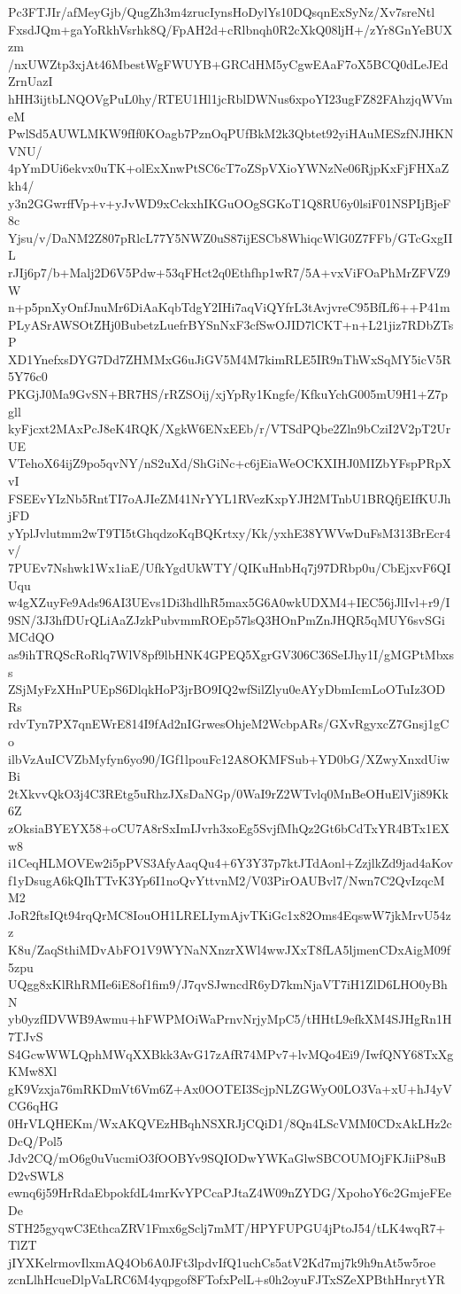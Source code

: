 Pc3FTJIr/afMeyGjb/QugZh3m4zrucIynsHoDylYs10DQsqnExSyNz/Xv7sreNtl
FxsdJQm+gaYoRkhVsrhk8Q/FpAH2d+cRlbnqh0R2cXkQ08ljH+/zYr8GnYeBUXzm
/nxUWZtp3xjAt46MbestWgFWUYB+GRCdHM5yCgwEAaF7oX5BCQ0dLeJEdZrnUazI
hHH3ijtbLNQOVgPuL0hy/RTEU1Hl1jcRblDWNus6xpoYI23ugFZ82FAhzjqWVmeM
PwlSd5AUWLMKW9fIf0KOagb7PznOqPUfBkM2k3Qbtet92yiHAuMESzfNJHKNVNU/
4pYmDUi6ekvx0uTK+olExXnwPtSC6cT7oZSpVXioYWNzNe06RjpKxFjFHXaZkh4/
y3n2GGwrffVp+v+yJvWD9xCckxhIKGuOOgSGKoT1Q8RU6y0lsiF01NSPIjBjeF8c
Yjsu/v/DaNM2Z807pRlcL77Y5NWZ0uS87ijESCb8WhiqcWlG0Z7FFb/GTcGxgIIL
rJIj6p7/b+Malj2D6V5Pdw+53qFHct2q0Ethfhp1wR7/5A+vxViFOaPhMrZFVZ9W
n+p5pnXyOnfJnuMr6DiAaKqbTdgY2IHi7aqViQYfrL3tAvjvreC95BfLf6++P41m
PLyASrAWSOtZHj0BubetzLuefrBYSnNxF3cfSwOJID7lCKT+n+L21jiz7RDbZTsP
XD1YnefxsDYG7Dd7ZHMMxG6uJiGV5M4M7kimRLE5IR9nThWxSqMY5icV5R5Y76c0
PKGjJ0Ma9GvSN+BR7HS/rRZSOij/xjYpRy1Kngfe/KfkuYchG005mU9H1+Z7pgll
kyFjcxt2MAxPcJ8eK4RQK/XgkW6ENxEEb/r/VTSdPQbe2Zln9bCziI2V2pT2UrUE
VTehoX64ijZ9po5qvNY/nS2uXd/ShGiNc+c6jEiaWeOCKXIHJ0MIZbYFspPRpXvI
FSEEvYIzNb5RntTI7oAJIeZM41NrYYL1RVezKxpYJH2MTnbU1BRQfjEIfKUJhjFD
yYplJvlutmm2wT9TI5tGhqdzoKqBQKrtxy/Kk/yxhE38YWVwDuFsM313BrEcr4v/
7PUEv7Nshwk1Wx1iaE/UfkYgdUkWTY/QIKuHnbHq7j97DRbp0u/CbEjxvF6QIUqu
w4gXZuyFe9Ads96AI3UEvs1Di3hdlhR5max5G6A0wkUDXM4+IEC56jJlIvl+r9/I
9SN/3J3hfDUrQLiAaZJzkPubvmmROEp57lsQ3HOnPmZnJHQR5qMUY6svSGiMCdQO
as9ihTRQScRoRlq7WlV8pf9lbHNK4GPEQ5XgrGV306C36SeIJhy1I/gMGPtMbxss
ZSjMyFzXHnPUEpS6DlqkHoP3jrBO9IQ2wfSilZlyu0eAYyDbmIcmLoOTuIz3ODRs
rdvTyn7PX7qnEWrE814I9fAd2nIGrwesOhjeM2WcbpARs/GXvRgyxcZ7Gnsj1gCo
ilbVzAuICVZbMyfyn6yo90/IGf1lpouFc12A8OKMFSub+YD0bG/XZwyXnxdUiwBi
2tXkvvQkO3j4C3REtg5uRhzJXsDaNGp/0WaI9rZ2WTvlq0MnBeOHuElVji89Kk6Z
zOksiaBYEYX58+oCU7A8rSxImIJvrh3xoEg5SvjfMhQz2Gt6bCdTxYR4BTx1EXw8
i1CeqHLMOVEw2i5pPVS3AfyAaqQu4+6Y3Y37p7ktJTdAonl+ZzjlkZd9jad4aKov
f1yDsugA6kQIhTTvK3Yp6I1noQvYttvnM2/V03PirOAUBvl7/Nwn7C2QvIzqcMM2
JoR2ftsIQt94rqQrMC8IouOH1LRELIymAjvTKiGc1x82Oms4EqswW7jkMrvU54zz
K8u/ZaqSthiMDvAbFO1V9WYNaNXnzrXWl4wwJXxT8fLA5ljmenCDxAigM09f5zpu
UQgg8xKlRhRMIe6iE8of1fim9/J7qvSJwncdR6yD7kmNjaVT7iH1ZlD6LHO0yBhN
yb0yzfIDVWB9Awmu+hFWPMOiWaPrnvNrjyMpC5/tHHtL9efkXM4SJHgRn1H7TJvS
S4GcwWWLQphMWqXXBkk3AvG17zAfR74MPv7+lvMQo4Ei9/IwfQNY68TxXgKMw8Xl
gK9Vzxja76mRKDmVt6Vm6Z+Ax0OOTEI3ScjpNLZGWyO0LO3Va+xU+hJ4yVCG6qHG
0HrVLQHEKm/WxAKQVEzHBqhNSXRJjCQiD1/8Qn4LScVMM0CDxAkLHz2cDcQ/Pol5
Jdv2CQ/mO6g0uVucmiO3fOOBYv9SQIODwYWKaGlwSBCOUMOjFKJiiP8uBD2vSWL8
ewnq6j59HrRdaEbpokfdL4mrKvYPCcaPJtaZ4W09nZYDG/XpohoY6c2GmjeFEeDe
STH25gyqwC3EthcaZRV1Fmx6gSclj7mMT/HPYFUPGU4jPtoJ54/tLK4wqR7+TlZT
jIYXKelrmovIlxmAQ4Ob6A0JFt3lpdvIfQ1uchCs5atV2Kd7mj7k9h9nAt5w5roe
zcnLlhHcueDlpVaLRC6M4yqpgof8FTofxPelL+s0h2oyuFJTxSZeXPBthHnrytYR
